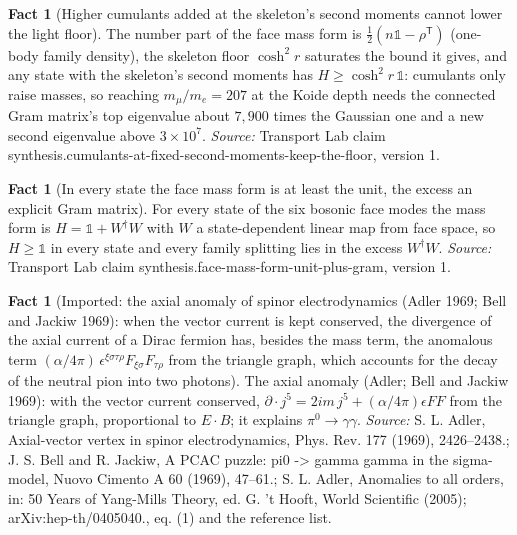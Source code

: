\documentclass[11pt]{article}
\theoremstyle{definition}
\newtheorem{fact}[theorem]{Fact}
\theoremstyle{plain}
\begin{document}
\begin{fact}[Higher cumulants added at the skeleton's second moments cannot lower the light floor]\label{c:synthesis.cumulants-at-fixed-second-moments-keep-the-floor}
The number part of the face mass form is $\tfrac12(n\mathbb{1} - \rho^{\mathsf{T}})$ (one-body family density), the skeleton floor $\cosh^{2}r$ saturates the bound it gives, and any state with the skeleton's second moments has $H \ge \cosh^{2}r\,\mathbb{1}$: cumulants only raise masses, so reaching $m_{\mu}/m_{e} = 207$ at the Koide depth needs the connected Gram matrix's top eigenvalue about $7{,}900$ times the Gaussian one and a new second eigenvalue above $3 \times 10^{7}$.
\emph{Source:} Transport Lab claim synthesis.cumulants-at-fixed-second-moments-keep-the-floor, version 1.
\end{fact}

\begin{fact}[In every state the face mass form is at least the unit, the excess an explicit Gram matrix]\label{c:synthesis.face-mass-form-unit-plus-gram}
For every state of the six bosonic face modes the mass form is $H = \mathbb{1} + W^{\dagger}W$ with $W$ a state-dependent linear map from face space, so $H \ge \mathbb{1}$ in every state and every family splitting lies in the excess $W^{\dagger}W$.
\emph{Source:} Transport Lab claim synthesis.face-mass-form-unit-plus-gram, version 1.
\end{fact}

\begin{fact}[Imported: the axial anomaly of spinor electrodynamics (Adler 1969; Bell and Jackiw 1969): when the vector current is kept conserved, the divergence of the axial current of a Dirac fermion has, besides the mass term, the anomalous term $(\alpha/4\pi)\,\epsilon^{\xi\sigma\tau\rho}F_{\xi\sigma}F_{\tau\rho}$ from the triangle graph, which accounts for the decay of the neutral pion into two photons]\label{c:synthesis.imported-adler-bell-jackiw-axial-anomaly}
The axial anomaly (Adler; Bell and Jackiw 1969): with the vector current conserved, $\partial\cdot j^{5} = 2im\,j^{5} + (\alpha/4\pi)\epsilon FF$ from the triangle graph, proportional to $E\cdot B$; it explains $\pi^{0} \to \gamma\gamma$.
\emph{Source:} S. L. Adler, Axial-vector vertex in spinor electrodynamics, Phys. Rev. 177 (1969), 2426--2438.; J. S. Bell and R. Jackiw, A PCAC puzzle: pi0 -> gamma gamma in the sigma-model, Nuovo Cimento A 60 (1969), 47--61.; S. L. Adler, Anomalies to all orders, in: 50 Years of Yang-Mills Theory, ed. G. 't Hooft, World Scientific (2005); arXiv:hep-th/0405040., eq. (1) and the reference list.
\end{fact}
\end{document}
